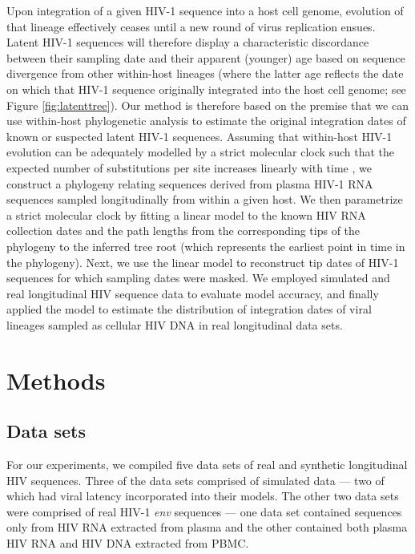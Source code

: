 \documentclass{bmcart}
\begin{document}
Upon integration of a given HIV-1 sequence into a host cell genome, evolution of that lineage effectively ceases until a new round of virus replication ensues.
Latent HIV-1 sequences will therefore display a characteristic discordance between their sampling date and their apparent (younger) age based on sequence divergence from other within-host lineages (where the latter age reflects the date on which that HIV-1 sequence originally integrated into the host cell genome; see Figure \ref{fig:latenttree}).
Our method is therefore based on the premise that we can use within-host phylogenetic analysis to estimate the original integration dates of known or suspected latent HIV-1 sequences.
Assuming that within-host HIV-1 evolution can be adequately modelled by a strict molecular clock such that the expected number of substitutions per site increases linearly with time \cite{Ho14}, we construct a phylogeny relating sequences derived from plasma HIV-1 RNA sequences sampled longitudinally from within a given host. We then parametrize a strict molecular clock by fitting a linear model to the known HIV RNA collection dates and the path lengths from the corresponding tips of the phylogeny to the inferred tree root (which represents the earliest point in time in the phylogeny).
Next, we use the linear model to reconstruct tip dates of HIV-1 sequences for which sampling dates were masked. 
We employed simulated and real longitudinal HIV sequence data to evaluate model accuracy, and finally applied the model to estimate the distribution of integration dates of viral lineages sampled as cellular HIV DNA in real longitudinal data sets.


\section * {Methods} \label{sec:methods}

\subsection * {Data sets}
For our experiments, we compiled five data sets of real and synthetic longitudinal HIV sequences.
Three of the data sets comprised of simulated data --- two of which had viral latency incorporated into their models.
The other two data sets were comprised of real HIV-1 \emph{env} sequences --- one data set contained sequences only from HIV RNA extracted from plasma and the other contained both plasma HIV RNA and HIV DNA extracted from PBMC.
\end{document}

